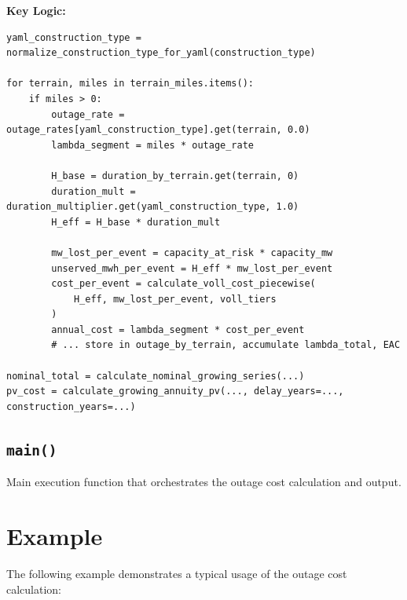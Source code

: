 \documentclass[ctcc_full_documentation.tex]{subfiles}
\begin{document}
\textbf{Key Logic:}
\begin{lstlisting}
yaml_construction_type = normalize_construction_type_for_yaml(construction_type)

for terrain, miles in terrain_miles.items():
    if miles > 0:
        outage_rate = outage_rates[yaml_construction_type].get(terrain, 0.0)
        lambda_segment = miles * outage_rate

        H_base = duration_by_terrain.get(terrain, 0)
        duration_mult = duration_multiplier.get(yaml_construction_type, 1.0)
        H_eff = H_base * duration_mult

        mw_lost_per_event = capacity_at_risk * capacity_mw
        unserved_mwh_per_event = H_eff * mw_lost_per_event
        cost_per_event = calculate_voll_cost_piecewise(
            H_eff, mw_lost_per_event, voll_tiers
        )
        annual_cost = lambda_segment * cost_per_event
        # ... store in outage_by_terrain, accumulate lambda_total, EAC

nominal_total = calculate_nominal_growing_series(...)
pv_cost = calculate_growing_annuity_pv(..., delay_years=..., construction_years=...)
\end{lstlisting}

\subsection{\texttt{main()}}

Main execution function that orchestrates the outage cost calculation and output.

\section{Example}

The following example demonstrates a typical usage of the outage cost calculation:
\end{document}
